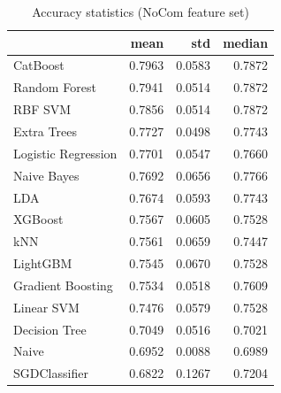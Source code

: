 \begin{table}
\caption{Accuracy statistics (NoCom feature set)}
\label{tab:accuracy_NoCom_stats}
\begin{tabular}{lrrr}
\toprule
 & mean & std & median \\
\midrule
CatBoost & 0.7963 & 0.0583 & 0.7872 \\
Random Forest & 0.7941 & 0.0514 & 0.7872 \\
RBF SVM & 0.7856 & 0.0514 & 0.7872 \\
Extra Trees & 0.7727 & 0.0498 & 0.7743 \\
Logistic Regression & 0.7701 & 0.0547 & 0.7660 \\
Naive Bayes & 0.7692 & 0.0656 & 0.7766 \\
LDA & 0.7674 & 0.0593 & 0.7743 \\
XGBoost & 0.7567 & 0.0605 & 0.7528 \\
kNN & 0.7561 & 0.0659 & 0.7447 \\
LightGBM & 0.7545 & 0.0670 & 0.7528 \\
Gradient Boosting & 0.7534 & 0.0518 & 0.7609 \\
Linear SVM & 0.7476 & 0.0579 & 0.7528 \\
Decision Tree & 0.7049 & 0.0516 & 0.7021 \\
Naive & 0.6952 & 0.0088 & 0.6989 \\
SGDClassifier & 0.6822 & 0.1267 & 0.7204 \\
\bottomrule
\end{tabular}
\end{table}
